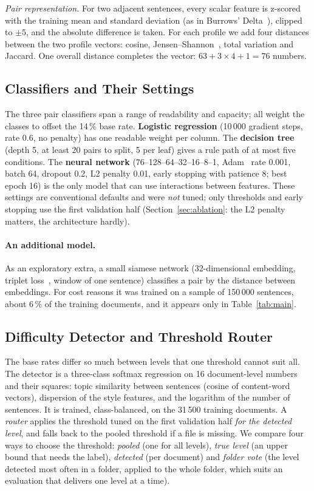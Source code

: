 \documentclass[runningheads]{llncs}
\begin{document}
\emph{Pair representation.} For two adjacent sentences, every scalar feature is z-scored with the training mean and standard deviation (as in Burrows' Delta~\cite{burrows2002delta}), clipped to $\pm 5$, and the absolute difference is taken. For each profile we add four distances between the two profile vectors: cosine, Jensen--Shannon~\cite{lin1991divergence}, total variation and Jaccard. One overall distance completes the vector: $63 + 3\times 4 + 1 = 76$ numbers.

\subsection{Classifiers and Their Settings}

The three pair classifiers span a range of readability and capacity; all weight the classes to offset the 14\,\% base rate. \textbf{Logistic regression} (10\,000 gradient steps, rate 0.6, no penalty) has one readable weight per column. The \textbf{decision tree}~\cite{breiman1984cart} (depth 5, at least 20 pairs to split, 5 per leaf) gives a rule path of at most five conditions. The \textbf{neural network} (76--128--64--32--16--8--1, Adam~\cite{kingma2015adam} rate 0.001, batch 64, dropout 0.2, L2 penalty 0.01, early stopping with patience 8; best epoch 16) is the only model that can use interactions between features. These settings are conventional defaults and were \emph{not} tuned; only thresholds and early stopping use the first validation half (Section~\ref{sec:ablation}: the L2 penalty matters, the architecture hardly).

\paragraph{An additional model.} As an exploratory extra, a small siamese network (32-dimensional embedding, triplet loss~\cite{schroff2015facenet}, window of one sentence) classifies a pair by the distance between embeddings. For cost reasons it was trained on a sample of 150\,000 sentences, about 6\,\% of the training documents, and it appears only in Table~\ref{tab:main}.

\subsection{Difficulty Detector and Threshold Router}

The base rates differ so much between levels that one threshold cannot suit all. The detector is a three-class softmax regression on 16 document-level numbers and their squares: topic similarity between sentences (cosine of content-word vectors), dispersion of the style features, and the logarithm of the number of sentences. It is trained, class-balanced, on the 31\,500 training documents. A \emph{router} applies the threshold tuned on the first validation half \emph{for the detected level}, and falls back to the pooled threshold if a file is missing. We compare four ways to choose the threshold: \emph{pooled} (one for all levels), \emph{true level} (an upper bound that needs the label), \emph{detected} (per document) and \emph{folder vote} (the level detected most often in a folder, applied to the whole folder, which suits an evaluation that delivers one level at a time).
\end{document}
